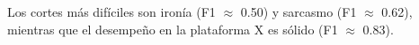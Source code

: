 Los cortes más difíciles son ironía (F1 $\approx$ 0.50) y sarcasmo (F1 $\approx$ 0.62), mientras que el desempeño en la plataforma X es sólido (F1 $\approx$ 0.83).
